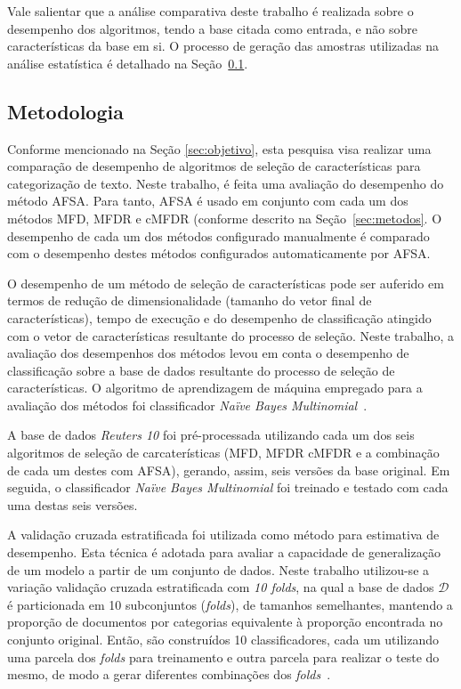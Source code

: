 \documentclass[conference]{IEEEtran}
\begin{document}
Vale salientar que  a análise comparativa deste trabalho é realizada sobre o desempenho dos algoritmos, tendo a base citada como entrada, e não sobre características da base em si. O processo de geração das amostras utilizadas na análise estatística é detalhado na Seção~\ref{sec:metodologia}.

\subsection{Metodologia}
\label{sec:metodologia}

Conforme mencionado na Seção \ref{sec:objetivo}, esta pesquisa visa realizar uma comparação de desempenho de algoritmos de seleção de características para categorização de texto.
Neste trabalho, é feita uma avaliação do desempenho do método AFSA. Para tanto, AFSA é usado em conjunto com cada um dos métodos MFD, MFDR e cMFDR (conforme descrito na Seção~\ref{sec:metodos}. O desempenho de cada um dos métodos configurado manualmente é comparado com o desempenho destes métodos configurados automaticamente por AFSA.

O desempenho de um método de seleção de características pode ser auferido em termos de redução de dimensionalidade (tamanho do vetor final de características), tempo de execução e do desempenho de classificação atingido com o vetor de características resultante do processo de seleção. Neste trabalho, a avaliação dos desempenhos dos métodos levou em conta o desempenho de classificação sobre a base de dados resultante do processo de seleção de características. O algoritmo de aprendizagem de máquina empregado para a avaliação dos métodos foi classificador \textit{Na\"ive Bayes Multinomial}~\cite{mccallum1998comparison}. 

A base de dados \textit{Reuters 10} foi pré-processada utilizando cada um dos seis algoritmos de seleção de carcaterísticas (MFD, MFDR cMFDR e a combinação de cada um destes com AFSA), gerando, assim, seis versões da base original. Em seguida, o classificador \textit{Na\"ive Bayes Multinomial} foi treinado e testado com cada uma destas seis versões.

A validação cruzada estratificada foi utilizada como método para estimativa de desempenho.
Esta técnica é adotada para avaliar a capacidade de generalização de um modelo a partir de um conjunto de dados.
Neste trabalho utilizou-se a variação validação cruzada estratificada com \emph{10 folds}, na qual a base de dados $\mathcal{D}$ é particionada em 10 subconjuntos (\emph{folds}), de tamanhos semelhantes, mantendo a proporção de documentos por categorias equivalente à proporção encontrada no conjunto original. Então, são construídos 10 classificadores, cada um utilizando uma parcela dos \emph{folds} para treinamento e outra parcela para realizar o teste do mesmo, de modo a gerar diferentes combinações dos \emph{folds}~\cite{kohavi1995study}.
\end{document}
